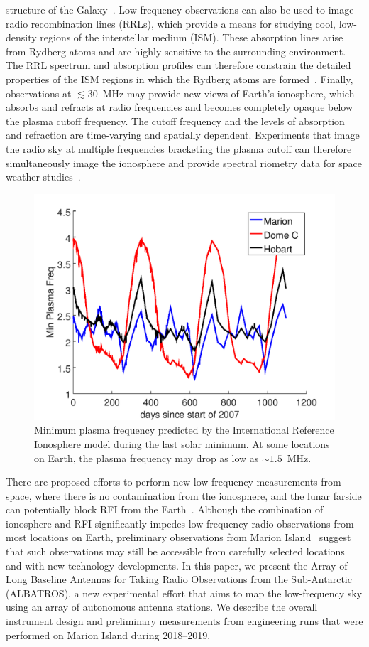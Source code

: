\documentclass{ws-jai}
\def\albatros{ALBATROS}
\begin{document}
structure of the Galaxy~\citep{2002ApJ...575..217P}.  Low-frequency
observations can also be used to image radio recombination lines
(RRLs), which provide a means for studying cool, low-density regions
of the interstellar medium (ISM).  These absorption lines arise from
Rydberg atoms and are highly sensitive to the surrounding environment.
The RRL spectrum and absorption profiles can therefore constrain the
detailed properties of the ISM regions in which the Rydberg atoms are
formed~\citep{2009NewAR..53..259G, 2007MNRAS.374..852S}.  Finally,
observations at $\lesssim30$~MHz may provide new views of Earth's
ionosphere, which absorbs and refracts at radio frequencies and
becomes completely opaque below the plasma cutoff frequency.  The
cutoff frequency and the levels of absorption and refraction are
time-varying and spatially dependent.  Experiments that image the
radio sky at multiple frequencies bracketing the plasma cutoff can
therefore simultaneously image the ionosphere and provide spectral
riometry data for space weather studies~\citep{2014GeoRL..41.5370K}.

\begin{figure}
  \begin{center}
    \includegraphics[width=0.6\linewidth]{Figures/marion_domec_hobart.png}
    \caption{Minimum plasma frequency predicted by the International
      Reference Ionosphere model during the last solar minimum.  At
      some locations on Earth, the plasma frequency may drop as low as
      $\sim1.5$~MHz.}
    \label{Fig:iri}
  \end{center}
\end{figure}

There are proposed efforts to perform new low-frequency measurements
from space, where there is no contamination from the ionosphere, and
the lunar farside can potentially block RFI from the
Earth~\citep{2019arXiv190710853C, 2019arXiv190804296K}.  Although the
combination of ionosphere and RFI significantly impedes low-frequency
radio observations from most locations on Earth, preliminary
observations from Marion Island~\citep{2019JAI.....850004P} suggest
that such observations may still be accessible from carefully selected
locations and with new technology developments.  In this paper, we
present the Array of Long Baseline Antennas for Taking Radio
Observations from the Sub-Antarctic (\albatros), a new experimental
effort that aims to map the low-frequency sky using an array of
autonomous antenna stations.  We describe the overall instrument
design and preliminary measurements from engineering runs that were
performed on Marion Island during 2018--2019.
\end{document}
